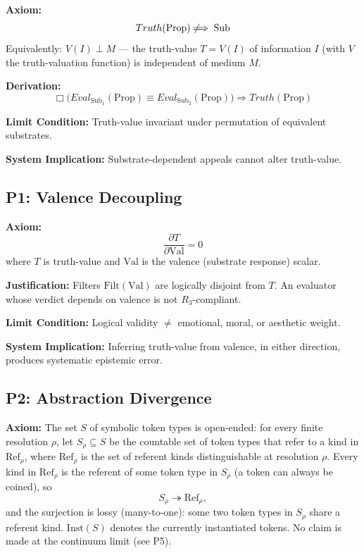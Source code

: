 \documentclass{article}
\newcommand{\Prop}{\mathrm{Prop}}
\newcommand{\Sub}{\mathrm{Sub}}
\newcommand{\Val}{\mathrm{Val}}
\newcommand{\PhysRef}{\mathrm{Ref}}
\newcommand{\Filt}{\mathrm{Filt}}
\begin{document}
\textbf{Axiom:}
\[ Truth(\Prop) \not\!\!\implies \Sub \]
Equivalently: $V(I) \perp M$ --- the truth-value $T = V(I)$ of information $I$
(with $V$ the truth-valuation function) is independent of medium $M$.

\textbf{Derivation:}
\[ \Box\bigl(Eval_{\Sub_1}(\Prop) \equiv Eval_{\Sub_2}(\Prop)\bigr) \Rightarrow Truth(\Prop) \]

\textbf{Limit Condition:} Truth-value invariant under permutation of equivalent
substrates.

\textbf{System Implication:} Substrate-dependent appeals cannot alter truth-value.

\bigskip

\subsection*{P1: Valence Decoupling}

\textbf{Axiom:}
\[ \frac{\partial T}{\partial \Val} = 0 \]
where $T$ is truth-value and $\Val$ is the valence (substrate response) scalar.

\textbf{Justification:}
Filters $\Filt(\Val)$ are logically disjoint from $T$.
An evaluator whose verdict depends on valence is not $R_3$-compliant.

\textbf{Limit Condition:} Logical validity $\neq$ emotional, moral, or aesthetic weight.

\textbf{System Implication:}
Inferring truth-value from valence, in either direction, produces systematic epistemic error.

\bigskip

\subsection*{P2: Abstraction Divergence}

\textbf{Axiom:}
The set $S$ of symbolic token types is open-ended: for every finite resolution $\rho$,
let $S_{\rho}\subseteq S$ be the countable set of token types that refer to a kind in $\PhysRef_{\rho}$,
where $\PhysRef_{\rho}$ is the set of referent kinds distinguishable at resolution $\rho$.
Every kind in $\PhysRef_{\rho}$ is the referent of some token type in $S_{\rho}$ (a token can always be coined), so
\[ S_{\rho} \twoheadrightarrow \PhysRef_{\rho}, \]
and the surjection is lossy (many-to-one): some two token types in $S_{\rho}$ share a referent kind. $\mathrm{Inst}(S)$ denotes the currently
instantiated tokens. No claim is made at the continuum limit (see P5).
\end{document}
